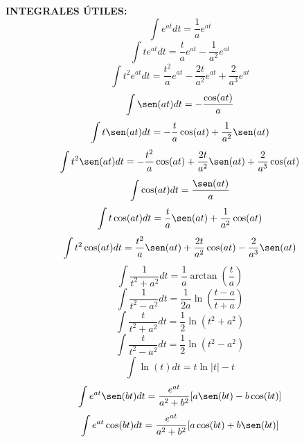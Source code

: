 \documentclass[letter,twoside,8pt]{article}
\begin{document}
\textbf{INTEGRALES ÚTILES:}
\begin{equation*}
    \int{e}^{at}{dt}=\frac{1}{a}e^{at}
\end{equation*}
\begin{equation*}
    \int{t}{e}^{at}{dt}=\frac{t}{a}{e}^{at}-\frac{1}{a^2}{e}^{at}
\end{equation*}
\begin{equation*}
    \int{t^2}{e}^{at}{dt}=\frac{t^2}{a}{e}^{at}-\frac{2t}{a^2}{e}^{at}+\frac{2}{a^3}e^{at}
\end{equation*}
\begin{equation*}
    \int\sen(at){dt}=-\frac{\cos(at)}{a}
\end{equation*}
\begin{equation*}
    \int{t}\sen(at){dt}=-\frac{t}{a}\cos(at)+\frac{1}{a^2}\sen(at)
\end{equation*}
\begin{equation*}
    \int{t^2}\sen(at){dt}=-\frac{t^2}{a}\cos(at)+\frac{2t}{a^2}\sen(at)+\frac{2}{a^3}\cos(at)
\end{equation*}
\begin{equation*}
    \int\cos(at){dt}=\frac{\sen(at)}{a}
\end{equation*}
\begin{equation*}
    \int{t}\cos(at){dt}=\frac{t}{a}\sen(at)+\frac{1}{a^2}\cos(at)
\end{equation*}
\begin{equation*}
    \int{t^2}\cos(at){dt}=\frac{t^2}{a}\sen(at)+\frac{2t}{a^2}\cos(at)-\frac{2}{a^3}\sen(at)
\end{equation*}
\begin{equation*}
    \int\frac{1}{t^2+a^2}dt=\frac{1}{a}\arctan\left(\frac{t}{a}\right)
\end{equation*}
\begin{equation*}
    \int\frac{1}{t^2-a^2}dt=\frac{1}{2a}\ln\left(\frac{t-a}{t+a}\right)
\end{equation*}
\begin{equation*}
    \int\frac{t}{t^2+a^2}dt=\frac{1}{2}\ln(t^2+a^2)
\end{equation*}
\begin{equation*}
    \int\frac{t}{t^2-a^2}dt=\frac{1}{2}\ln(t^2-a^2)
\end{equation*}
\begin{equation*}
    \int\ln(t)dt=t\ln|t|-t
\end{equation*}
\begin{equation*}
    \int{e}^{at}\sen(bt){dt}=\frac{e^{at}}{a^2+b^2}[a\sen(bt)-b\cos(bt)]
\end{equation*}
\begin{equation*}
    \int{e}^{at}\cos(bt){dt}=\frac{e^{at}}{a^2+b^2}[a\cos(bt)+b\sen(bt)]
\end{equation*}
\end{document}
